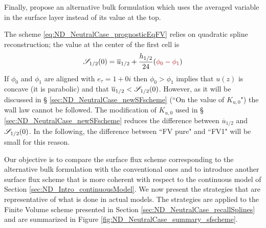 Finally, \citep{nishizawa_surface_2018} propose an alternative
bulk formulation which uses the averaged variable in the surface layer
instead of its value at the top.
\begin{remark}
The scheme \eqref{eq:ND_NeutralCase_prognosticEqFV} relies
	on quadratic spline reconstruction;
the value at the center of the first cell is
		\begin{equation}
			{\cal S}_{1/2}(0) = \overline{u}_{1/2}
			+ \frac{h_{1/2}}{24} (\emphase{\phi_0-\phi_1})
		\end{equation}
 If $\phi_0$ and $\phi_1$ are aligned with $e_\tau=1+0i$ then
	$\phi_0 > \phi_1$ implies that $u(z)$ is concave
	(it is parabolic) and
	that $\overline{u}_{1/2} < {\cal S}_{1/2}(0)$.
	However, as it will be discussed in \S
	\ref{sec:ND_NeutralCase_newSFscheme}
	(``On the value of $K_{u,0}$")
	the wall law cannot be followed.
	The modification of $K_{u,0}$ used in \S
	\ref{sec:ND_NeutralCase_newSFscheme} reduces
	the difference between $\overline{u}_{1/2}$
	and ${\cal S}_{1/2}(0)$.
	In the following, the
	difference between ``FV pure" and ``FV1"
	will be small for this reason.
\end{remark}
%
Our objective is to compare the surface flux scheme
corresponding to the alternative bulk formulation with the
conventional ones
and to introduce another surface flux scheme that is more coherent
with respect to the continuous model of Section
\ref{sec:ND_Intro_continuousModel}.
We now present the strategies that are representative of
what is done in actual models. The strategies are applied to
the Finite Volume scheme presented in Section
\ref{sec:ND_NeutralCase_recallSplines} and are
summarized in Figure \ref{fig:ND_NeutralCase_summary_sfscheme}.
